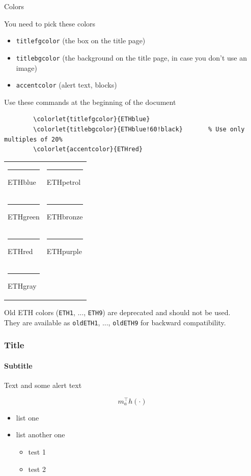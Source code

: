 \documentclass[11pt,aspectratio=169]{beamer}
\begin{document}
\begin{frame}[fragile]{Colors}

	You need to pick these colors
	\begin{itemize}
		\item \texttt{titlefgcolor} (the box on the title page)
		\item \texttt{titlebgcolor} (the background on the title page, in case you don't use an image)
		\item \texttt{accentcolor} (alert text, blocks)
	\end{itemize}
	Use these commands at the beginning of the document
	\begin{verbatim}
		\colorlet{titlefgcolor}{ETHblue}
		\colorlet{titlebgcolor}{ETHblue!60!black}		% Use only multiples of 20%
		\colorlet{accentcolor}{ETHred}
	\end{verbatim}

	\medskip

	\begin{tabular}{ll}
	\textcolor{ETHblue}{\rule{4mm}{3mm}} ETHblue &
	\textcolor{ETHpetrol}{\rule{4mm}{3mm}} ETHpetrol \\
	\textcolor{ETHgreen}{\rule{4mm}{3mm}} ETHgreen &
	\textcolor{ETHbronze}{\rule{4mm}{3mm}} ETHbronze \\
	\textcolor{ETHred}{\rule{4mm}{3mm}} ETHred &
	\textcolor{ETHpurple}{\rule{4mm}{3mm}} ETHpurple \\
	\textcolor{ETHgray}{\rule{4mm}{3mm}} ETHgray 
	\end{tabular}
	
	\medskip

	Old ETH colors (\verb+ETH1+, ..., \verb+ETH9+) are deprecated and should not be used.\\
	They are available as \verb+oldETH1+, ..., \verb+oldETH9+ for backward compatibility.
	

\end{frame}

\begin{frame}

	\frametitle{Title}
	\framesubtitle{Subtitle}
	
	Text and some \alert{alert text}
	
	\[
	m_a^\top h(\cdot)
	\]
	
	
	\begin{itemize}
	\item list one
	\item list another one
		\begin{itemize}
		\item test 1
		\item test 2
		\end{itemize}
	\end{itemize}

\end{frame}
\end{document}
